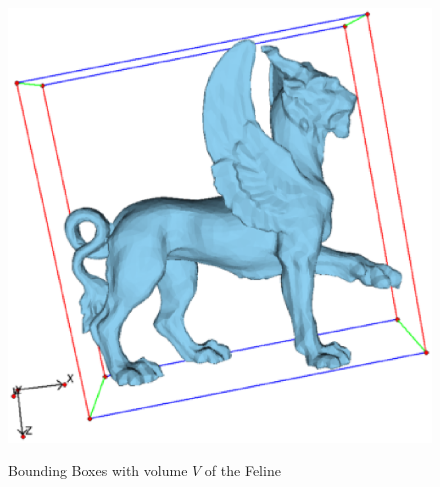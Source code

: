 \documentclass[a4paper,10pt,notitlepage]{scrreprt}
\begin{document}
\begin{figure}
{    \includegraphics[scale=0.4]{bbox-v3-feline.eps}}
 \caption{Bounding Boxes with volume $V$ of the Feline}
 \label{fig:bbox-feline}
\end{figure}
\end{document}
